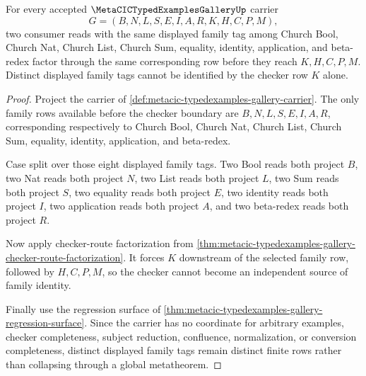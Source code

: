 \begin{theorem}
\label{thm:metacic-typedexamples-gallery-family-row-determinacy}
For every accepted $\MetaCICTypedExamplesGalleryUp$ carrier
$$
G=(B,N,L,S,E,I,A,R,K,H,C,P,M),
$$
two consumer reads with the same displayed family tag among Church Bool, Church Nat, Church List, Church Sum, equality, identity, application, and beta-redex factor through the same corresponding row before they reach $K,H,C,P,M$. Distinct displayed family tags cannot be identified by the checker row $K$ alone.
\end{theorem}
\begin{proof}
Project the carrier of \autoref{def:metacic-typedexamples-gallery-carrier}. The only family rows available before the checker boundary are $B,N,L,S,E,I,A,R$, corresponding respectively to Church Bool, Church Nat, Church List, Church Sum, equality, identity, application, and beta-redex.

Case split over those eight displayed family tags. Two Bool reads both project $B$, two Nat reads both project $N$, two List reads both project $L$, two Sum reads both project $S$, two equality reads both project $E$, two identity reads both project $I$, two application reads both project $A$, and two beta-redex reads both project $R$.

Now apply checker-route factorization from \autoref{thm:metacic-typedexamples-gallery-checker-route-factorization}. It forces $K$ downstream of the selected family row, followed by $H,C,P,M$, so the checker cannot become an independent source of family identity.

Finally use the regression surface of \autoref{thm:metacic-typedexamples-gallery-regression-surface}. Since the carrier has no coordinate for arbitrary examples, checker completeness, subject reduction, confluence, normalization, or conversion completeness, distinct displayed family tags remain distinct finite rows rather than collapsing through a global metatheorem.
\end{proof}

